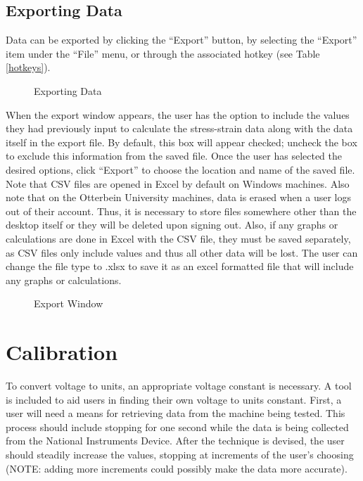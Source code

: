 \documentclass[12pt,letterpaper, USenglish]{article}
\theoremstyle{definition}
\numberwithin{theorem}{section}
\numberwithin{lemma}{section}
\numberwithin{corollary}{section}
\numberwithin{definition}{section}
\numberwithin{example}{section}
\numberwithin{equation}{theorem}
\begin{document}
\subsection{Exporting Data} \label{exportSection}
Data can be exported by clicking the ``Export'' button, by selecting the ``Export'' item under the ``File'' menu, or through the associated hotkey (see Table \ref{hotkeys}).
\begin{figure}[H]
    \centering
    \hspace{1em}
    \caption{Exporting Data}
\end{figure}
When the export window appears, the user has the option to include the values they had previously input to calculate the stress-strain data along with the data itself in the export file. By default, this box will appear checked; uncheck the box to exclude this information from the saved file. Once the user has selected the desired options, click ``Export'' to choose the location and name of the saved file. Note that CSV files are opened in Excel by default on Windows machines. Also note that on the Otterbein University machines, data is erased when a user logs out of their account. Thus, it is necessary to store files somewhere other than the desktop itself or they will be deleted upon signing out. Also, if any graphs or calculations are done in Excel with the CSV file, they must be saved separately, as CSV files only include values and thus all other data will be lost. The user can change the file type to .xlsx to save it as an excel formatted file that will include any graphs or calculations.
\begin{figure}[H]
    \centering
    \caption{Export Window }
\end{figure}

\section{Calibration} \label{calibrationSection}
To convert voltage to units, an appropriate voltage constant is necessary. A tool is included to aid users in finding their own voltage to units constant. First, a user will need a means for retrieving data from the machine being tested. This process should include stopping for one second while the data is being collected from the National Instruments Device. After the technique is devised, the user should steadily increase the values, stopping at increments of the user's choosing (NOTE: adding more increments could possibly make the data more accurate). 
\end{document}
